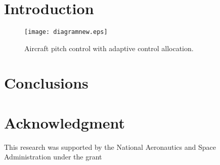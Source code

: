 \documentclass[letterpaper, 10 pt, conference]{ieeeconf}
\begin{document}
\newtheorem{lem}{\bf Lemma}%
\newtheorem{rem}{\bf Remark}%
\newtheorem{pro}{\bf Proposition}%
\newtheorem{defn}{\bf Definition}%
\newtheorem{thm}{\bf Theorem}%
\newtheorem{assu}{Assumption}%
\newcommand{\tr}{{\rm tr}}
\newcommand{\ts}{& \hspace{-0.05in}}
\newcommand{\nn}{\nonumber}
\newtheorem{ex}{Example}[section]
\newcommand{\bp}{\bigskip}
\newcommand{\slp}{\smallskip}
\newcommand{\diag}{{\rm diag}}
\newcommand{\sign}{{\rm sign}}
\baselineskip 0.41cm
\newcommand{\rank}{{\rm rank}}
\newcommand{\qed}{\hfill \ensuremath{\Box}}




\title{\bf \LARGE }

\author{}
\date{}
\maketitle


\begin{abstract}

\end{abstract}




\section{\bf Introduction}


\begin{figure}[htbp]
\centerline{\texttt{[image: diagramnew.eps]}}
\caption{Aircraft pitch control with adaptive control
  allocation.}
\label{blockdiag}
\end{figure}

\section{\bf Conclusions}


\section*{Acknowledgment}
This research was supported by the National Aeronautics and Space Administration under the grant

%
\end{document}
